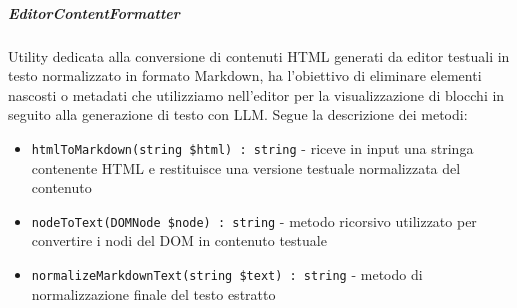 \documentclass[a4paper,10pt]{article}
\begin{document}
\subparagraph{EditorContentFormatter} Utility dedicata alla conversione di contenuti HTML generati da editor testuali in testo normalizzato in formato Markdown, ha l'obiettivo di eliminare elementi nascosti o metadati che utilizziamo nell'editor per la visualizzazione di blocchi in seguito alla generazione di testo con LLM. Segue la descrizione dei metodi:
\begin{itemize}
    \item \texttt{htmlToMarkdown(string \$html) : string} - riceve in input una stringa contenente HTML e restituisce una versione testuale normalizzata del contenuto
    \item \texttt{nodeToText(DOMNode \$node) : string} - metodo ricorsivo utilizzato per convertire i nodi del DOM in contenuto testuale
    \item \texttt{normalizeMarkdownText(string \$text) : string} - metodo di normalizzazione finale del testo estratto
\end{itemize}
\end{document}
